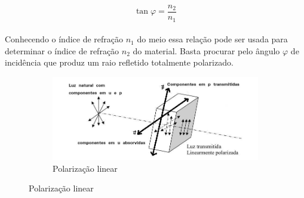 \documentclass[a4paper,11pt]{article}
\begin{document}
\begin{equation}
	\tan \varphi = \frac{n_2}{n_1}
	\label{eq:n-refrac}
\end{equation}  

\paragraph{}Conhecendo o índice de refração $n_1$ do meio essa relação pode ser usada para determinar o índice de refração $n_2$ do material. Basta procurar pelo ângulo $\varphi$ de incidência que produz um raio refletido totalmente polarizado.
\FloatBarrier
\begin{figure}[!htp]
	\centering	
	
	\begin{subfigure}[!htp]{0.3\textwidth}
		\includegraphics[scale= 0.4]{./images/linear-pol.jpg}
		\caption{Polarização linear}
		\label{fig:pol-linear}
	\end{subfigure} 
	

\end{figure}
\end{document}
